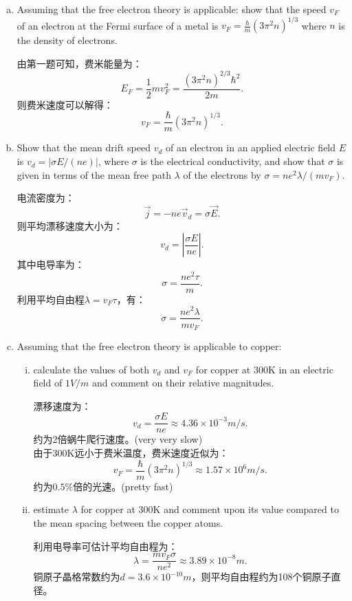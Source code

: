 \documentclass[reqno,a4paper,12pt]{amsart}
\begin{document}
\begin{enumerate}[(a)]
	\item Assuming that the free electron theory is applicable: show that the speed $v_F$ of an electron at the Fermi surface of a metal is $v_F = \frac{\hbar}{m}(3\pi^2n)^{1/3}$ where $n$ is the density of electrons. 
	
	\begin{tcolorbox}[breakable, colback = black!5!white, colframe = black]
	由第一题可知，费米能量为：
	\[
		E_F = \frac{1}{2}mv_F^2 = \frac{(3\pi^2n)^{2/3}\hbar^2}{2m}.
	\]
	则费米速度可以解得：
	\[
		v_F = \frac{\hbar}{m}(3\pi^2n)^{1/3}.
	\]
	\end{tcolorbox}
	
	\item Show that the mean drift speed $v_d$ of an electron in an applied electric field $E$ is $v_d = \vert \sigma E/(ne) \vert$, where $\sigma$ is the electrical conductivity, and show that $\sigma$ is given in terms of the mean free path $\lambda$ of the electrons by $\sigma = ne^2\lambda/(mv_F)$.
	
	\begin{tcolorbox}[breakable, colback = black!5!white, colframe = black]
	电流密度为：
	\[
		\vec{j} = -ne\vec{v}_d = \sigma \vec{E}.
	\]
	则平均漂移速度大小为：
	\[
		v_d = \left\vert \frac{\sigma E}{ne} \right\vert.
	\]
	其中电导率为：
	\[
		\sigma = \frac{ne^2\tau}{m}.
	\]
	利用平均自由程$\lambda = v_F\tau$，有：
	\[
		\sigma = \frac{ne^2\lambda}{mv_F}.
	\]
	\end{tcolorbox}
	
	\item Assuming that the free electron theory is applicable to copper: 
	\begin{enumerate}[(i)]
		\item calculate the values of both $v_d$ and $v_F$ for copper at 300K in an electric field of $1 V/m$ and comment on their relative magnitudes. 
		\begin{tcolorbox}[breakable, colback = black!5!white, colframe = black]
		漂移速度为：
		\[
			v_d = \frac{\sigma E}{ne} \approx 4.36 \times 10^{-3}m/s.
		\]
		约为2倍蜗牛爬行速度。(very very slow) \\
		由于300K远小于费米温度，费米速度近似为：
		\[
			v_F = \frac{\hbar}{m}(3\pi^2n)^{1/3} \approx 1.57 \times 10^{6} m/s.
		\]
		约为$0.5\%$倍的光速。(pretty fast)
		\end{tcolorbox}
		
		\item estimate $\lambda$ for copper at 300K and comment upon its value compared to the mean spacing between the copper atoms.
		\begin{tcolorbox}[breakable, colback = black!5!white, colframe = black]
		利用电导率可估计平均自由程为：
		\[
			\lambda = \frac{mv_F\sigma}{ne^2} \approx 3.89 \times 10^{-8} m.
		\]
		铜原子晶格常数约为$d = 3.6\times 10^{-10}m$，则平均自由程约为108个铜原子直径。
		\end{tcolorbox}
	\end{enumerate}
\end{enumerate}
\end{document}

